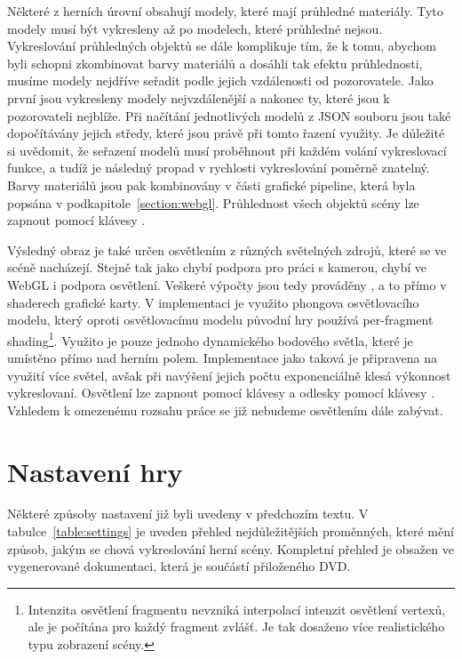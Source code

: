 Některé z herních úrovní obsahují modely, které mají průhledné materiály. Tyto modely musí být vykresleny až po modelech, které průhledné nejsou. Vykreslování průhledných objektů se dále komplikuje tím, že k tomu, abychom byli schopni zkombinovat barvy materiálů a dosáhli tak efektu průhlednosti, musíme modely nejdříve seřadit podle jejich vzdálenosti od pozorovatele. Jako první jsou vykresleny modely nejvzdálenější a nakonec ty, které jsou k pozorovateli nejblíže. Při načítání jednotlivých modelů z JSON souboru jsou také dopočítávány jejich středy, které jsou právě při tomto řazení využity. Je důležité si uvědomit, že seřazení modelů musí proběhnout při každém volání vykreslovací funkce, a tudíž je následný propad v rychlosti vykreslování poměrně znatelný. Barvy materiálů jsou pak kombinovány v části grafické pipeline, která byla popsána v podkapitole~\ref{section:webgl}. Průhlednost všech objektů scény lze zapnout pomocí klávesy .

\pagebreak
{}
Výsledný obraz je také určen osvětlením z různých světelných zdrojů, které se ve scéně nacházejí. Stejně tak jako chybí podpora pro práci s kamerou, chybí ve WebGL i podpora osvětlení. Veškeré výpočty jsou tedy prováděny , a to přímo v shaderech grafické karty. V implementaci je využito phongova osvětlovacího modelu, který oproti osvětlovacímu modelu původní hry používá per-fragment shading\footnote{Intenzita osvětlení fragmentu nevzniká interpolací intenzit osvětlení vertexů, ale je počítána pro každý fragment zvlášť. Je tak dosaženo více realistického typu zobrazení scény.}. Využito je pouze jednoho dynamického bodového světla, které je umístěno přímo nad herním polem. Implementace jako taková je připravena na využití více světel, avšak při navýšení jejich počtu exponenciálně klesá výkonnost vykreslovaní. Osvětlení lze zapnout pomocí klávesy  a odlesky pomocí klávesy . Vzhledem k omezenému rozsahu práce se již nebudeme osvětlením dále zabývat. 

\section{Nastavení hry}
\label{section:nastaveni}
Některé způsoby nastavení již byli uvedeny v předchozím textu. V tabulce~\ref{table:settings} je uveden přehled nejdůležitějších proměnných, které mění způsob, jakým se chová vykreslování herní scény. Kompletní přehled je obsažen ve vygenerované dokumentaci, která je součástí přiloženého DVD.

